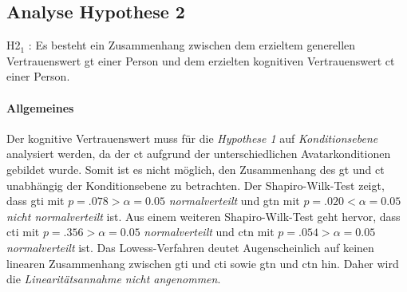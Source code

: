 \documentclass[a4paper,11pt]{article}%
\renewcommand{\\}{\vspace*{0.5\baselineskip} \newline}
\begin{document}
\newpage

\subsection{Analyse Hypothese 2}
H2$_{1}$ : Es besteht ein Zusammenhang zwischen dem erzieltem generellen Vertrauenswert \ac{gt} einer Person und dem erzielten kognitiven Vertrauenswert \ac{ct} einer Person.

\paragraph{Allgemeines}
Der kognitive Vertrauenswert muss für die \textit{Hypothese 1} auf \textit{Konditionsebene} analysiert werden, da der \ac{ct} aufgrund der unterschiedlichen Avatarkonditionen gebildet wurde. Somit ist es nicht möglich, den Zusammenhang des \ac{gt} und \ac{ct} unabhängig der Konditionsebene zu betrachten.
Der Shapiro-Wilk-Test zeigt, dass \ac{gti} mit  $p = .078 > \alpha = 0.05$ \textit{normalverteilt} und \ac{gtn} mit $p = .020 < \alpha = 0.05$ \textit{nicht normalverteilt} ist. \\
Aus einem weiteren Shapiro-Wilk-Test geht hervor, dass \ac{cti} mit  $p = .356 > \alpha = 0.05$ \textit{normalverteilt} und \ac{ctn} mit $p = .054 > \alpha = 0.05$ \textit{normalverteilt} ist.
Das Lowess-Verfahren deutet Augenscheinlich auf keinen linearen Zusammenhang zwischen \ac{gti} und \ac{cti} sowie \ac{gtn} und \ac{ctn} hin. Daher wird die \textit{Linearitätsannahme nicht angenommen}.
\end{document}
